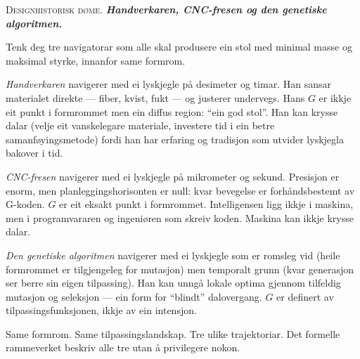 \documentclass[10pt]{book}
\theoremstyle{definition}
\theoremstyle{plain}
\theoremstyle{remark}
\newenvironment{designhistorie}%
  {\medskip\noindent\textsc{Designhistorisk d\o me.}\itshape\enspace}%
  {\medskip}
\begin{document}
\begin{designhistorie}
\textbf{Handverkaren, CNC-fresen og den genetiske algoritmen.}

Tenk deg tre navigatorar som alle skal produsere ein stol med minimal masse og maksimal styrke, innanfor same formrom.

\textit{Handverkaren} navigerer med ei lyskjegle p\aa{} desimeter og timar. Han sansar materialet direkte --- fiber, kvist, fukt --- og justerer undervegs. Hans $G$ er ikkje eit punkt i formrommet men ein diffus region: ``ein god stol''. Han kan krysse dalar (velje eit vanskelegare materiale, investere tid i ein betre samanf\o yingsmetode) fordi han har erfaring og tradisjon som utvider lyskjegla bakover i tid.

\textit{CNC-fresen} navigerer med ei lyskjegle p\aa{} mikrometer og sekund. Presisjon er enorm, men planleggingshorisonten er null: kvar bevegelse er forh\aa ndsbestemt av G-koden. $G$ er eit eksakt punkt i formrommet. Intelligensen ligg ikkje i maskina, men i programvararen og ingeni\o ren som skreiv koden. Maskina kan ikkje krysse dalar.

\textit{Den genetiske algoritmen} navigerer med ei lyskjegle som er romsleg vid (heile formrommet er tilgjengeleg for mutasjon) men temporalt grunn (kvar generasjon ser berre sin eigen tilpassing). Han kan unng\aa{} lokale optima gjennom tilfeldig mutasjon og seleksjon --- ein form for ``blindt'' dalovergang. $G$ er definert av tilpassingsfunksjonen, ikkje av ein intensjon.

Same formrom. Same tilpassingslandskap. Tre ulike trajektoriar. Det formelle rammeverket beskriv alle tre utan \aa{} privilegere nokon.
\end{designhistorie}
\end{document}
